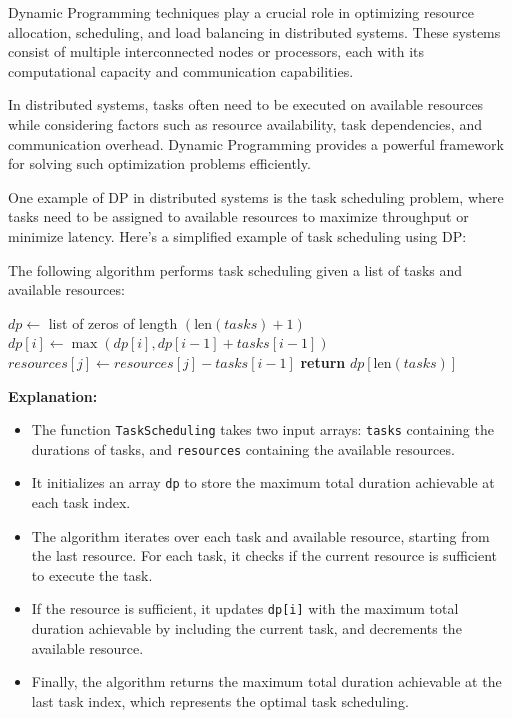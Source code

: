 \documentclass[12pt]{book} %
\begin{document}
Dynamic Programming techniques play a crucial role in optimizing resource allocation, scheduling, and load balancing in distributed systems. These systems consist of multiple interconnected nodes or processors, each with its computational capacity and communication capabilities.

In distributed systems, tasks often need to be executed on available resources while considering factors such as resource availability, task dependencies, and communication overhead. Dynamic Programming provides a powerful framework for solving such optimization problems efficiently.


One example of DP in distributed systems is the task scheduling problem, where tasks need to be assigned to available resources to maximize throughput or minimize latency. Here's a simplified example of task scheduling using DP:

The following algorithm performs task scheduling given a list of tasks and available resources:

\begin{algorithm}
\caption{Task Scheduling}\label{task-scheduling}
\begin{algorithmic}[1]
    \State $dp \gets$ list of zeros of length $(\text{len}(tasks) + 1)$
                \State $dp[i] \gets \max(dp[i], dp[i-1] + tasks[i-1])$
                \State $resources[j] \gets resources[j] - tasks[i-1]$
            \EndIf
        \EndFor
    \EndFor
    \State \textbf{return} $dp[\text{len}(tasks)]$
\EndProcedure
\end{algorithmic}
\end{algorithm}
\FloatBarrier
\textbf{Explanation:}
\begin{itemize}
    \item The function \texttt{TaskScheduling} takes two input arrays: \texttt{tasks} containing the durations of tasks, and \texttt{resources} containing the available resources.
    \item It initializes an array \texttt{dp} to store the maximum total duration achievable at each task index.
    \item The algorithm iterates over each task and available resource, starting from the last resource. For each task, it checks if the current resource is sufficient to execute the task.
    \item If the resource is sufficient, it updates \texttt{dp[i]} with the maximum total duration achievable by including the current task, and decrements the available resource.
    \item Finally, the algorithm returns the maximum total duration achievable at the last task index, which represents the optimal task scheduling.
\end{itemize}
\end{document}
